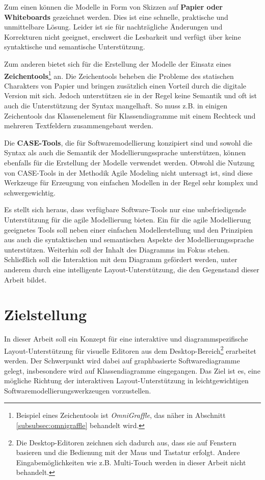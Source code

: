 Zum einen können die Modelle in Form von Skizzen auf \textbf{Papier oder Whiteboards} gezeichnet werden. Dies ist eine schnelle, praktische und unmittelbare Lösung. Leider ist sie für nachträgliche Änderungen und Korrekturen nicht geeignet, erschwert die Lesbarkeit und verfügt über keine syntaktische und semantische Unterstützung.

Zum anderen bietet sich für die Erstellung der Modelle der Einsatz eines \textbf{Zeichentools}\footnote{Beispiel eines Zeichentools ist \textit{OmniGraffle}, das näher in Abschnitt \ref{subsubsec:omnigraffle} behandelt wird.} an. Die Zeichentools beheben die Probleme des statischen Charakters von Papier und bringen zusätzlich einen Vorteil durch die digitale Version mit sich. Jedoch unterstützen sie in der Regel keine Semantik und oft ist auch die Unterstützung der Syntax mangelhaft. So muss z.B. in einigen Zeichentools das Klassenelement für Klassendiagramme mit einem Rechteck und mehreren Textfeldern zusammengebaut werden.

Die \textbf{CASE-Tools}, die für Softwaremodellierung konzipiert sind und sowohl die Syntax als auch die Semantik der Modellierungssprache unterstützen, können ebenfalls für die Erstellung der Modelle verwendet werden. Obwohl die Nutzung von CASE-Tools in der Methodik Agile Modeling nicht untersagt ist, sind diese Werkzeuge für Erzeugung von einfachen Modellen in der Regel sehr komplex und schwergewichtig.

Es stellt sich heraus, dass verfügbare Software-Tools nur eine unbefriedigende Unterstützung für die agile Modellierung bieten. Ein für die agile Modellierung geeignetes Tools soll neben einer einfachen Modellerstellung und den Prinzipien aus \cite{Ambler02Agile} auch die syntaktischen und semantischen Aspekte der Modellierungssprache unterstützen. Weiterhin soll der Inhalt des Diagramms im Fokus stehen. Schließlich soll die Interaktion mit dem Diagramm gefördert werden, unter anderem durch eine intelligente Layout-Unterstützung, die den Gegenstand dieser Arbeit bildet.

\section{Zielstellung}

In dieser Arbeit soll ein Konzept für eine interaktive und diagrammspezifische Layout-Un\-ter\-stüt\-zung für visuelle Editoren aus dem Desktop-Bereich\footnote{Die Desktop-Editoren zeichnen sich dadurch aus, dass sie auf Fenstern basieren und die Bedienung mit der Maus und Tastatur erfolgt. Andere Eingabemöglichkeiten wie z.B. Multi-Touch werden in dieser Arbeit nicht behandelt.} erarbeitet werden. Der Schwerpunkt wird dabei auf graphbasierte Softwarediagramme gelegt, insbesondere wird auf Klassendiagramme eingegangen. Das Ziel ist es, eine mögliche Richtung der interaktiven Layout-Unterstützung in leichtgewichtigen Softwaremodellierungswerkzeugen vorzustellen.

